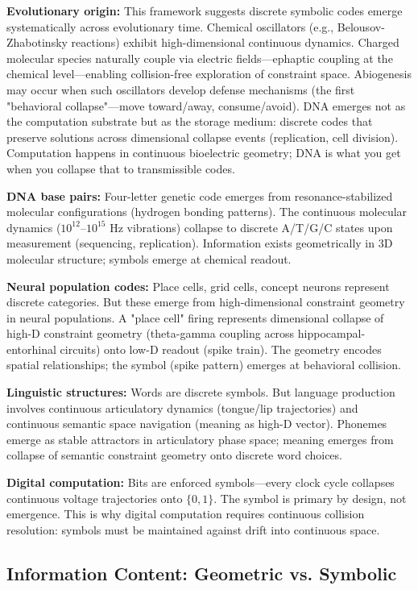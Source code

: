 \documentclass[12pt]{article}
\begin{document}
\textbf{Evolutionary origin:} This framework suggests discrete symbolic codes emerge systematically across evolutionary time. Chemical oscillators (e.g., Belousov-Zhabotinsky reactions) exhibit high-dimensional continuous dynamics. Charged molecular species naturally couple via electric fields—ephaptic coupling at the chemical level—enabling collision-free exploration of constraint space. Abiogenesis may occur when such oscillators develop defense mechanisms (the first "behavioral collapse"—move toward/away, consume/avoid). DNA emerges not as the computation substrate but as the storage medium: discrete codes that preserve solutions across dimensional collapse events (replication, cell division). Computation happens in continuous bioelectric geometry; DNA is what you get when you collapse that to transmissible codes.

\textbf{DNA base pairs:} Four-letter genetic code emerges from resonance-stabilized molecular configurations (hydrogen bonding patterns). The continuous molecular dynamics ($10^{12}$--$10^{15}$ Hz vibrations) collapse to discrete A/T/G/C states upon measurement (sequencing, replication). Information exists geometrically in 3D molecular structure; symbols emerge at chemical readout.

\textbf{Neural population codes:} Place cells, grid cells, concept neurons represent discrete categories. But these emerge from high-dimensional constraint geometry in neural populations. A "place cell" firing represents dimensional collapse of high-D constraint geometry (theta-gamma coupling across hippocampal-entorhinal circuits) onto low-D readout (spike train). The geometry encodes spatial relationships; the symbol (spike pattern) emerges at behavioral collision.

\textbf{Linguistic structures:} Words are discrete symbols. But language production involves continuous articulatory dynamics (tongue/lip trajectories) and continuous semantic space navigation (meaning as high-D vector). Phonemes emerge as stable attractors in articulatory phase space; meaning emerges from collapse of semantic constraint geometry onto discrete word choices.

\textbf{Digital computation:} Bits are enforced symbols---every clock cycle collapses continuous voltage trajectories onto $\{0,1\}$. The symbol is primary by design, not emergence. This is why digital computation requires continuous collision resolution: symbols must be maintained against drift into continuous space.

\subsection{Information Content: Geometric vs. Symbolic}
\end{document}
